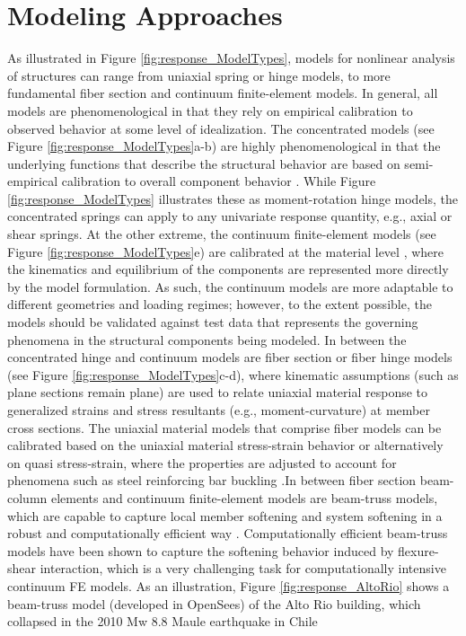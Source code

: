 \section{Modeling Approaches}
\label{sec:resp_struct_methods}

As illustrated in Figure \ref{fig:response_ModelTypes}, models for nonlinear analysis of structures can range from uniaxial spring or hinge models, to more fundamental fiber section and continuum finite-element models. In general, all models are phenomenological in that they rely on empirical calibration to observed behavior at some level of idealization. The concentrated models (see Figure \ref{fig:response_ModelTypes}a-b) are highly phenomenological in that the underlying functions that describe the structural behavior are based on semi-empirical calibration to overall component behavior \cite[e.g.][]{ibarra2005hysteretic, folz2001saws, lowes2003modeling, do2018damage}. While Figure \ref{fig:response_ModelTypes} illustrates these as moment-rotation hinge models, the concentrated springs can apply to any univariate response quantity, e.g., axial or shear springs. At the other extreme, the continuum finite-element models (see Figure \ref{fig:response_ModelTypes}e) are calibrated at the material level \cite[e.g.][]{lemaitre1990mechanics, dettmer2004theoretical, lee1998plasticdamage, maekawa2003nonlinear}, where the kinematics and equilibrium of the components are represented more directly by the model formulation. As such, the continuum models are more adaptable to different geometries and loading regimes; however, to the extent possible, the models should be validated against test data that represents the governing phenomena in the structural components being modeled. In between the concentrated hinge and continuum models are fiber section or fiber hinge models (see Figure \ref{fig:response_ModelTypes}c-d), where kinematic assumptions (such as plane sections remain plane) are used to relate uniaxial material response to generalized strains and stress resultants (e.g., moment-curvature) at member cross sections. The uniaxial material models that comprise fiber models can be calibrated based on the uniaxial material stress-strain behavior \citep[e.g.,][]{mander1988theoretical, dodd1995model, menegotto1973method} or alternatively on quasi stress-strain, where the properties are adjusted to account for phenomena such as steel reinforcing bar buckling \citep[e.g.,][]{kunnath2009nonlinear,dhakal2002pathdependent}.In between fiber section beam-column elements and continuum finite-element models are beam-truss models, which are capable to capture local member softening and system softening in a robust and computationally efficient way \citep{lu2014three, alvarez2020analysis}. Computationally efficient beam-truss models have been shown to capture the softening behavior induced by flexure-shear interaction, which is a very challenging task for computationally intensive continuum FE models. As an illustration, Figure \ref{fig:response_AltoRio} shows a beam-truss model (developed in OpenSees) of the Alto Rio building, which collapsed in the 2010 Mw 8.8 Maule earthquake in Chile \citep{zhang2017nonlinear}

